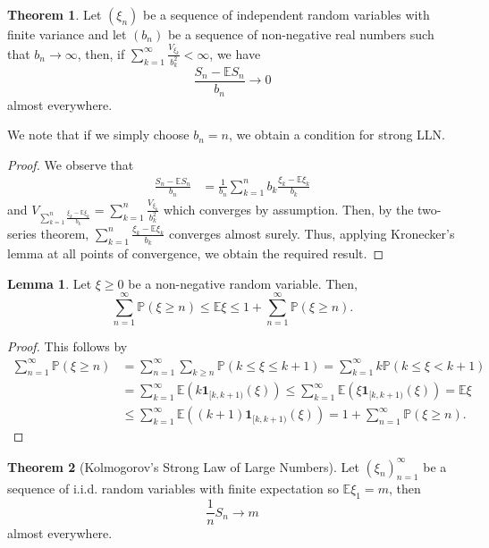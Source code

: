 \documentclass[]{article}
\theoremstyle{definition}
\newtheorem{theorem}{Theorem}
\theoremstyle{definition}
\newtheorem{lemma}{Lemma}[section]
\begin{document}
\begin{theorem}
  Let \((\xi_n)\) be a sequence of independent random variables with finite 
  variance and let \((b_n)\) be a sequence of non-negative real numbers such that 
  \(b_n \to \infty\), then, if \(\sum_{k = 1}^\infty \frac{V_{\xi_k}}{b_k^2} < \infty\),
  we have 
  \[\frac{S_n - \mathbb{E}S_n}{b_n} \to 0\]
  almost everywhere.
  
  We note that if we simply choose \(b_n = n\), we obtain a condition for 
  strong LLN.
\end{theorem}
\begin{proof}
  We observe that 
  \[\begin{split}
    \frac{S_n - \mathbb{E}S_n}{b_n} & = 
    \frac{1}{b_n} \sum_{k = 1}^n b_k \frac{\xi_k - \mathbb{E}\xi_k}{b_k}
  \end{split}\]
  and \(V_{\sum_{k = 1}^n \frac{\xi_k - \mathbb{E}\xi_k}{b_k}} = \sum_{k = 1}^n \frac{V_{\xi_k}}{b_k^2}\)
  which converges by assumption. Then, by the two-series theorem, 
  \(\sum_{k = 1}^n \frac{\xi_k - \mathbb{E}\xi_k}{b_k}\) converges 
  almost surely. Thus, applying Kronecker's lemma at all points of convergence, 
  we obtain the required result.
\end{proof}

\begin{lemma}
  Let \(\xi \ge 0\) be a non-negative random variable. Then, 
  \[\sum_{n = 1}^\infty\mathbb{P}(\xi \ge n) \le \mathbb{E}\xi \le 
    1 + \sum_{n = 1}^\infty\mathbb{P}(\xi \ge n).\]
\end{lemma}
\begin{proof}
  This follows by 
  \[\begin{split}
    \sum_{n = 1}^\infty \mathbb{P}(\xi \ge n) & = 
    \sum_{n = 1}^\infty \sum_{k \ge n} \mathbb{P}(k \le \xi \le k + 1)
    = \sum_{k = 1}^\infty k \mathbb{P}(k \le \xi < k + 1)\\
    & = \sum_{k = 1}^\infty \mathbb{E}(k \mathbf{1}_{[k, k + 1)}(\xi))
    \le \sum_{k = 1}^\infty \mathbb{E}(\xi \mathbf{1}_{[k, k + 1)}(\xi))
    = \mathbb{E}\xi \\
    & \le \sum_{k = 1}^\infty \mathbb{E}((k + 1) \mathbf{1}_{[k, k + 1)}(\xi))
    = 1 + \sum_{n = 1}^\infty\mathbb{P}(\xi \ge n).
  \end{split}\]
\end{proof}

\begin{theorem}[Kolmogorov's Strong Law of Large Numbers]
  Let \((\xi_n)_{n = 1}^\infty\) be a sequence of i.i.d. random variables with 
  finite expectation so \(\mathbb{E}\xi_1 = m\), then 
  \[\frac{1}{n}S_n \to m\]
  almost everywhere.
\end{theorem}
\end{document}
